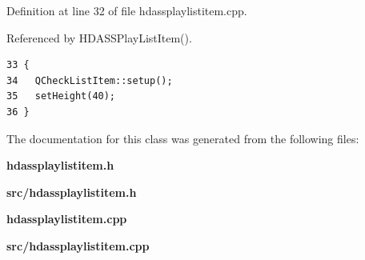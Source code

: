 Definition at line 32 of file hdassplaylistitem.cpp.

Referenced by HDASSPlay\-List\-Item().



\footnotesize\begin{verbatim}33 {
34   QCheckListItem::setup();
35   setHeight(40);
36 }
\end{verbatim}\normalsize 


The documentation for this class was generated from the following files:\begin{CompactItemize}
\item 
{\bf hdassplaylistitem.h}\item 
{\bf src/hdassplaylistitem.h}\item 
{\bf hdassplaylistitem.cpp}\item 
{\bf src/hdassplaylistitem.cpp}\end{CompactItemize}
